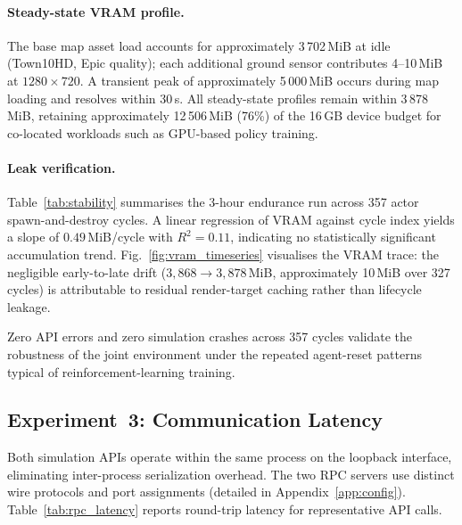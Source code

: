 \paragraph{Steady-state VRAM profile.}
The base map asset load accounts for approximately 3\,702\,MiB at idle
(Town10HD, Epic quality); each additional ground sensor contributes
4--10\,MiB at $1280\times720$.
A transient peak of approximately 5\,000\,MiB occurs during map loading and
resolves within 30\,s.
All steady-state profiles remain within 3\,878\,MiB, retaining approximately
12\,506\,MiB (76\%) of the 16\,GB device budget for co-located workloads such
as GPU-based policy training.

\paragraph{Leak verification.}
Table~\ref{tab:stability} summarises the 3-hour endurance run across 357 actor
spawn-and-destroy cycles.
A linear regression of VRAM against cycle index yields a slope of
$0.49$\,MiB/cycle with $R^2 = 0.11$, indicating no statistically significant
accumulation trend.
Fig.~\ref{fig:vram_timeseries} visualises the VRAM trace: the negligible
early-to-late drift ($3{,}868 \to 3{,}878$\,MiB, approximately 10\,MiB over
327 cycles) is attributable to residual render-target caching rather than
lifecycle leakage.




Zero API errors and zero simulation crashes across 357 cycles validate the
robustness of the joint environment under the repeated agent-reset patterns
typical of reinforcement-learning training.

\subsection{Experiment~3: Communication Latency}
\label{sec:perf:rpc}

Both simulation APIs operate within the same process on the loopback interface,
eliminating inter-process serialization overhead.
The two RPC servers use distinct wire protocols and port assignments (detailed
in Appendix~\ref{app:config}).
Table~\ref{tab:rpc_latency} reports round-trip latency for representative API
calls.



